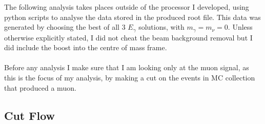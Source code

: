 The following analysis takes places outside of the processor I developed, using python scripts to analyse the data stored in the produced root file. This data was generated by choosing the best of all 3 ${E}_{\gamma}$ solutions, with  ${m}_{\gamma} = {m}_{\nu} = 0$. Unless otherwise explicitly stated, I did not cheat the beam background removal but I did include the boost into the centre of mass frame.
\\\\
Before any analysis I make sure that I am looking only at the muon signal, as this is the focus of my analysis, by making a cut on the events in MC collection that produced a muon.

\subsection{Cut Flow}
\label{SUBSEC:CutFlow}

